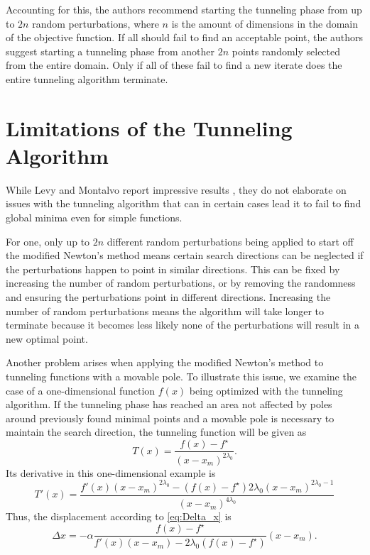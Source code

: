 \documentclass[a4paper,12pt,twoside]{article}
\begin{document}
Accounting for this, the authors recommend starting the tunneling phase from up to $2n$ random perturbations, where $n$ is the amount of dimensions in the domain of the objective function. If all should fail to find an acceptable point, the authors suggest starting a tunneling phase from another $2n$ points randomly selected from the entire domain. Only if all of these fail to find a new iterate does the entire tunneling algorithm terminate.

\section{Limitations of the Tunneling Algorithm} \label{sec:limitations}

While Levy and Montalvo report impressive results \cite[\S 5]{levy_tunneling_1985}, they do not elaborate on issues with the tunneling algorithm that can in certain cases lead it to fail to find global minima even for simple functions. 

For one, only up to $2n$ different random perturbations being applied to start off the modified Newton's method means certain search directions can be neglected if the perturbations happen to point in similar directions. This can be fixed by increasing the number of random perturbations, or by removing the randomness and ensuring the perturbations point in different directions. Increasing the number of random perturbations means the algorithm will take longer to terminate because it becomes less likely none of the perturbations will result in a new optimal point. 

Another problem arises when applying the modified Newton's method to tunneling functions with a movable pole. To illustrate this issue, we examine the case of a one-dimensional function $f(x)$ being optimized with the tunneling algorithm. If the tunneling phase has reached an area not affected by poles around previously found minimal points and a movable pole is necessary to maintain the search direction, the tunneling function will be given as 
\begin{equation*}
T(x) = \frac{f(x) - f^\star}{(x-x_m)^{2 \lambda_0}}.
\end{equation*}
Its derivative in this one-dimensional example is 
\begin{equation*}
T'(x) = \frac{f'(x) (x-x_m)^{2\lambda_0} - 
        (f(x)-f^\star ) 2\lambda_0 (x-x_m)^{2 \lambda_0-1}}
    {(x-x_m)^{4\lambda_0}}
\end{equation*}  
Thus, the displacement according to \eqref{eq:Delta_x} is 
\begin{equation} \label{eq:Dx_1d}
\Delta x = -\alpha \frac{f(x)-f^\star}{f'(x) (x-x_m) -2\lambda_0(f(x)-f^\star)} (x-x_m).
\end{equation}
\end{document}
